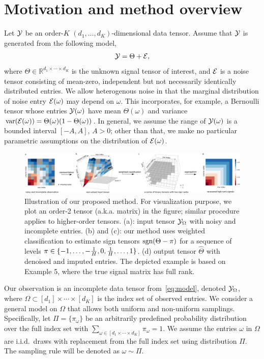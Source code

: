 \documentclass{article}
\theoremstyle{plain}
\theoremstyle{definition}
\def\sign{\textup{sgn}}
\begin{document}
\section{Motivation and method overview}

Let $\mathcal{Y}$ be an order-$K$ $(d_1,\ldots,d_K)$-dimensional data tensor. Assume that $\mathcal{Y}$ is generated from the following model,
\begin{equation}\label{eq:model}
\mathcal{Y}=\Theta+\mathcal{E},
\end{equation}
where $\Theta\in\mathbb{R}^{d_1\times \cdots \times d_K}$ is the unknown signal tensor of interest, and $\mathcal{E}$ is a noise tensor consisting of mean-zero, independent but not necessarily identically distributed entries. We allow heterogenous noise in that the marginal distribution of noise entry $\mathcal{E}(\omega)$ may depend on $\omega$. This incorporates, for example, a Bernoulli tensor whose entries $\mathcal{Y}(\omega)$ have mean $\Theta(\omega)$ and variance $\text{var}(\mathcal{E}(\omega))=\Theta(\omega)(1-\Theta(\omega))$. In general, we assume the range of $\mathcal{Y}(\omega)$ is a bounded interval $[-A, A]$, $A>0$; other than that, we make no particular parametric assumptions on the distribution of $\mathcal{E}(\omega)$.

\begin{figure}[h!]
\centerline{\includegraphics[width=1\textwidth]{image_new2.pdf}}
\caption{Illustration of our proposed method. For visualization purpose, we plot an order-2 tensor (a.k.a. matrix) in the figure; similar procedure applies to higher-order tensors. (a): input tensor $\mathcal{Y}_\Omega$ with noisy and incomplete entries. (b) and (c): our method uses weighted classification to estimate sign tensors $\sign(\Theta-\pi)$ for a sequence of levels $\pi\in \{-1,\ldots,-{1\over H},0,{1\over H},\ldots,1\}$. (d) output tensor $\hat \Theta$ with denoised and imputed entries. The depicted example is based on Example 5, where the true signal matrix has full rank. }\label{fig:demo}
\end{figure}

Our observation is an incomplete data tensor from~\eqref{eq:model}, denoted $\mathcal{Y}_\Omega$, where $\Omega\subset[d_1]\times\cdots\times[d_K]$ is the index set of observed entries. We consider a general model on $\Omega$ that allows both uniform and non-uniform samplings. Specifically, let $\Pi=\{\pi_\omega\}$ be an arbitrarily predefined probability distribution over the full index set with $\sum_{\omega\in[d_1\times \cdots \times d_K]}\pi_\omega=1$. We assume the entries $\omega$ in $\Omega$ are i.i.d.\ draws with replacement from the full index set using distribution $\Pi$. The sampling rule will be denoted as $\omega\sim \Pi$.
\end{document}
